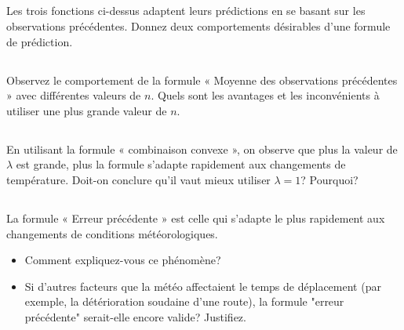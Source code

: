 \documentclass[letterpaper,12pt]{article}
\begin{document}
	
	
	\subsection{}
	
	Les trois fonctions ci-dessus adaptent leurs prédictions en se basant sur les observations
	précédentes. Donnez deux comportements désirables d'une formule de prédiction.
	

	
	
	
	
	
	
	\subsection{}
	Observez le comportement de la formule « Moyenne des observations précédentes » avec différentes valeurs de $n$. Quels sont les avantages et les inconvénients à utiliser une plus grande valeur de $n$. 
	
	\subsection{}
	En utilisant la formule « combinaison convexe », on observe que plus la valeur de $\lambda$ est grande, plus la formule s’adapte rapidement aux changements de température. Doit-on conclure qu’il vaut mieux utiliser $\lambda=1$? Pourquoi?
	
	\subsection{}
	La formule « Erreur précédente » est celle qui s’adapte le plus rapidement aux changements de conditions météorologiques. 
	\begin{itemize}
		\item Comment expliquez-vous ce phénomène? 
		\item Si d’autres facteurs que la météo affectaient le temps de déplacement (par exemple, la détérioration soudaine d'une route), la formule "erreur précédente" serait-elle encore valide? Justifiez.
	\end{itemize}
\end{document}
